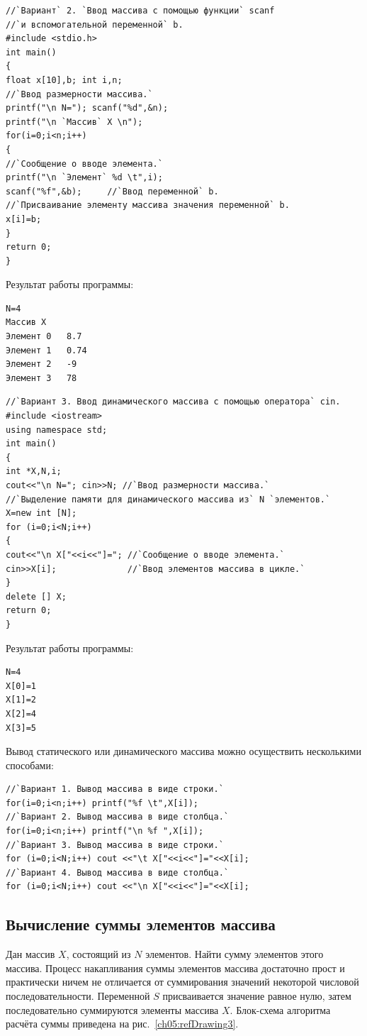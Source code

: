 \begin{lstlisting}
//`Вариант` 2. `Ввод массива с помощью функции` scanf 
//`и вспомогательной переменной` b.
#include <stdio.h>
int main()
{
float x[10],b; int i,n; 
//`Ввод размерности массива.`
printf("\n N="); scanf("%d",&n); 
printf("\n `Массив` X \n"); 
for(i=0;i<n;i++) 
{ 
//`Сообщение о вводе элемента.`
printf("\n `Элемент` %d \t",i); 
scanf("%f",&b);     //`Ввод переменной` b.
//`Присваивание элементу массива значения переменной` b.
x[i]=b; 
} 
return 0;
}
\end{lstlisting}

Результат работы программы:
\begin{verbatim}
N=4 
Массив X 
Элемент 0 	8.7 
Элемент 1 	0.74 
Элемент 2 	-9 
Элемент 3 	78 
\end{verbatim}

\begin{lstlisting}
//`Вариант 3. Ввод динамического массива с помощью оператора` cin.
#include <iostream>
using namespace std;
int main()
{
int *X,N,i;
cout<<"\n N="; cin>>N; //`Ввод размерности массива.`
//`Выделение памяти для динамического массива из` N `элементов.`
X=new int [N];
for (i=0;i<N;i++)
{
cout<<"\n X["<<i<<"]="; //`Сообщение о вводе элемента.`
cin>>X[i];              //`Ввод элементов массива в цикле.`
}
delete [] X;
return 0;
}
\end{lstlisting}

Результат работы программы:
\begin{verbatim}
N=4 
X[0]=1 
X[1]=2 
X[2]=4 
X[3]=5 
\end{verbatim}

Вывод статического или динамического массива можно осуществить несколькими способами:

\begin{lstlisting}
//`Вариант 1. Вывод массива в виде строки.`
for(i=0;i<n;i++) printf("%f \t",X[i]);
//`Вариант 2. Вывод массива в виде столбца.`
for(i=0;i<n;i++) printf("\n %f ",X[i]);
//`Вариант 3. Вывод массива в виде строки.`
for (i=0;i<N;i++) cout <<"\t X["<<i<<"]="<<X[i];
//`Вариант 4. Вывод массива в виде столбца.`
for (i=0;i<N;i++) cout <<"\n X["<<i<<"]="<<X[i];
\end{lstlisting}

\subsection[Вычисление суммы элементов массива]{Вычисление суммы элементов массива}
Дан массив $X$, состоящий из $N$ элементов. Найти сумму элементов этого массива.
Процесс накапливания суммы элементов массива достаточно прост и практически
ничем не отличается от суммирования значений некоторой числовой последовательности. Переменной $S$
присваивается значение равное нулю, затем последовательно суммируются элементы массива $X$. Блок-схема
алгоритма расчёта суммы приведена на рис.~\ref{ch05:refDrawing3}.

